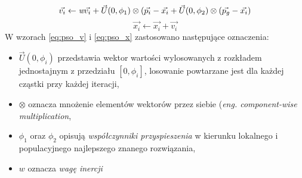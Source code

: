 \begin{equation} \label{eq:pso_v}
\vec{v_i} \leftarrow \emph{w}\vec{v_i} + \vec{U}(0,\phi_1)\otimes(\vec{p_i}-\vec{x_i}+\vec{U}(0,\phi_2)\otimes(\vec{p_g}-\vec{x_i})
\end{equation}
\begin{equation} \label{eq:pso_x}
\vec{x_i} \leftarrow \vec{x_i} + \vec{v_i}
\end{equation}
W wzorach \ref{eq:pso_v} i \ref{eq:pso_x} zastosowano następujące oznaczenia:
\begin{itemize}
\item $\vec{U}(0,\phi_i)$ przedstawia wektor wartości wylosowanych z rozkładem jednostajnym z przedziału $[0, \phi_i]$, losowanie powtarzane jest dla każdej cząstki przy każdej iteracji,
\item $\otimes$ oznacza mnożenie elementów wektorów przez siebie (\emph{eng. component-wise multiplication},
\item $\phi_1$ oraz $\phi_2$ opisują \emph{współczynniki przyspieszenia} w kierunku lokalnego i populacyjnego najlepszego znanego rozwiązania,
\item $w$ oznacza \emph{wagę inercji}
\end{itemize}

